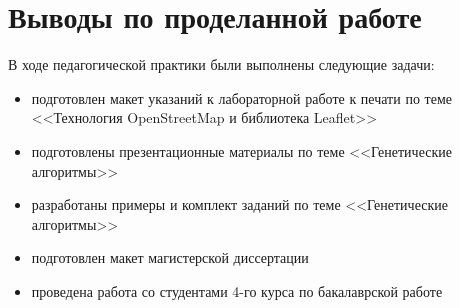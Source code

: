 \documentclass[a4paper, 14pt]{extreport}
\begin{document}
    \chapter{Выводы по проделанной работе}
    В ходе педагогической практики были выполнены следующие задачи:
    \begin{itemize}
        \item подготовлен макет указаний к лабораторной работе к печати по теме <<Технология OpenStreetMap и 
            библиотека Leaflet>>
        \item подготовлены презентационные материалы по теме <<Генетические алгоритмы>>
        \item разработаны примеры и комплект заданий по теме <<Генетические алгоритмы>>
        \item подготовлен макет магистерской диссертации
        \item проведена работа со студентами 4-го курса по бакалаврской работе
    \end{itemize}
\end{document}
